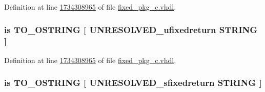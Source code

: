Definition at line \hyperlink{fixed__pkg__c_8vhdl_source_l1734308965}{1734308965} of file \hyperlink{fixed__pkg__c_8vhdl_source}{fixed\+\_\+pkg\+\_\+c.\+vhdl}.

\hypertarget{classfixed__pkg_a12ff3b142afffe809b1746be35f356d0}{}
\subsubsection[{T\+O\+\_\+\+O\+C\+T\+A\+L\+\_\+\+S\+T\+R\+I\+N\+G}]{ {\bfseries \textcolor{keywordflow}{is}\textcolor{vhdlchar}{ }\textcolor{vhdlchar}{T\+O\+\_\+\+O\+S\+T\+R\+I\+N\+G}\textcolor{vhdlchar}{ }\textcolor{vhdlchar}{\mbox{[}}\textcolor{vhdlchar}{ }\textcolor{vhdlchar}{U\+N\+R\+E\+S\+O\+L\+V\+E\+D\+\_\+ufixedreturn}\textcolor{vhdlchar}{ }\textcolor{comment}{S\+T\+R\+I\+N\+G}\textcolor{vhdlchar}{ }\textcolor{vhdlchar}{\mbox{]}}\textcolor{vhdlchar}{ }} \hspace{0.3cm}{\ttfamily [Alias]}}\label{classfixed__pkg_a12ff3b142afffe809b1746be35f356d0}


Definition at line \hyperlink{fixed__pkg__c_8vhdl_source_l1734308965}{1734308965} of file \hyperlink{fixed__pkg__c_8vhdl_source}{fixed\+\_\+pkg\+\_\+c.\+vhdl}.

\hypertarget{classfixed__pkg_aa56ca82d6a449c1ff4961a4ac182c355}{}
\subsubsection[{T\+O\+\_\+\+O\+C\+T\+A\+L\+\_\+\+S\+T\+R\+I\+N\+G}]{ {\bfseries \textcolor{keywordflow}{is}\textcolor{vhdlchar}{ }\textcolor{vhdlchar}{T\+O\+\_\+\+O\+S\+T\+R\+I\+N\+G}\textcolor{vhdlchar}{ }\textcolor{vhdlchar}{\mbox{[}}\textcolor{vhdlchar}{ }\textcolor{vhdlchar}{U\+N\+R\+E\+S\+O\+L\+V\+E\+D\+\_\+sfixedreturn}\textcolor{vhdlchar}{ }\textcolor{comment}{S\+T\+R\+I\+N\+G}\textcolor{vhdlchar}{ }\textcolor{vhdlchar}{\mbox{]}}\textcolor{vhdlchar}{ }} \hspace{0.3cm}{\ttfamily [Alias]}}\label{classfixed__pkg_aa56ca82d6a449c1ff4961a4ac182c355}


